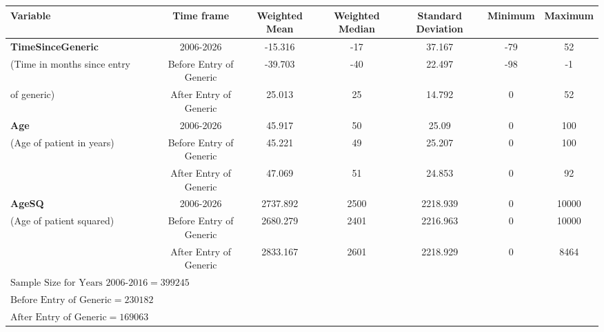 \begin{tabular}{l*{6}{c}}
\hline\hline
            Variable&\multicolumn{1}{c}{Time frame}&\multicolumn{1}{c}{Weighted Mean}&\multicolumn{1}{c}{Weighted Median}&\multicolumn{1}{c}{Standard Deviation}&\multicolumn{1}{c}{Minimum}&\multicolumn{1}{c}{Maximum}\\
\hline
\textbf{TimeSinceGeneric}                    &     2006-2026&             -15.316&    -17&   37.167&     -79&  52\\
(Time in months since entry &     Before Entry of Generic&     -39.703&    -40&    22.497 &     -98&  -1\\
 of generic)   &     After Entry of Generic&       25.013 &    25&      14.792&     0&  52\\
[1em]
\textbf{Age}                                 &     2006-2026&             45.917&    50&    25.09 &     0&  100\\
(Age of patient in years)           &     Before Entry of Generic&     45.221&    49&    25.207&     0&  100\\
                                    &     After Entry of Generic&      47.069&    51&    24.853&     0&  92\\
[1em]
\textbf{AgeSQ}                               &     2006-2026&             2737.892&    2500&  2218.939&     0&  10000\\
(Age of patient squared)   &     Before Entry of Generic&    2680.279&    2401&  2216.963 &     0&  10000\\
                                    &     After Entry of Generic&      2833.167&    2601&  2218.929 &     0&  8464\\
\hline
$\text{Sample Size for Years 2006-2016} = 399245$\\
$\text{Before Entry of Generic} = 230182$\\
$\text{After Entry of Generic} = 169063$\\
\hline\hline

\end{tabular}
